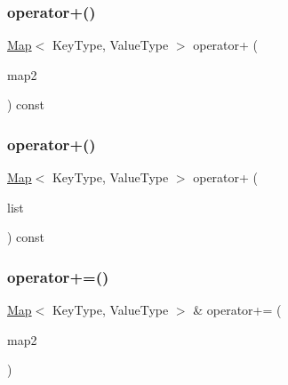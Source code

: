 \mbox{\label{classMap_af25292376af863c7defa9dd9a378d383}} 
\subsubsection{\texorpdfstring{operator+()}{operator+()}\hspace{0.1cm}{\footnotesize\ttfamily [1/2]}}
{\footnotesize\ttfamily \mbox{\hyperlink{classMap}{Map}}$<$ Key\+Type, Value\+Type $>$ operator+ (\begin{DoxyParamCaption}\item[{const \mbox{\hyperlink{classMap}{Map}}$<$ Key\+Type, Value\+Type $>$ \&}]{map2 }\end{DoxyParamCaption}) const}

\mbox{\label{classMap_a3fb55aac55ebd09ffd989a48627d2ab9}} 
\subsubsection{\texorpdfstring{operator+()}{operator+()}\hspace{0.1cm}{\footnotesize\ttfamily [2/2]}}
{\footnotesize\ttfamily \mbox{\hyperlink{classMap}{Map}}$<$ Key\+Type, Value\+Type $>$ operator+ (\begin{DoxyParamCaption}\item[{std\+::initializer\+\_\+list$<$ std\+::pair$<$ Key\+Type, Value\+Type $>$ $>$}]{list }\end{DoxyParamCaption}) const}

\mbox{\label{classMap_ac0478d198f73f2a6c45c03e453faa538}} 
\subsubsection{\texorpdfstring{operator+=()}{operator+=()}\hspace{0.1cm}{\footnotesize\ttfamily [1/2]}}
{\footnotesize\ttfamily \mbox{\hyperlink{classMap}{Map}}$<$ Key\+Type, Value\+Type $>$ \& operator+= (\begin{DoxyParamCaption}\item[{const \mbox{\hyperlink{classMap}{Map}}$<$ Key\+Type, Value\+Type $>$ \&}]{map2 }\end{DoxyParamCaption})}

